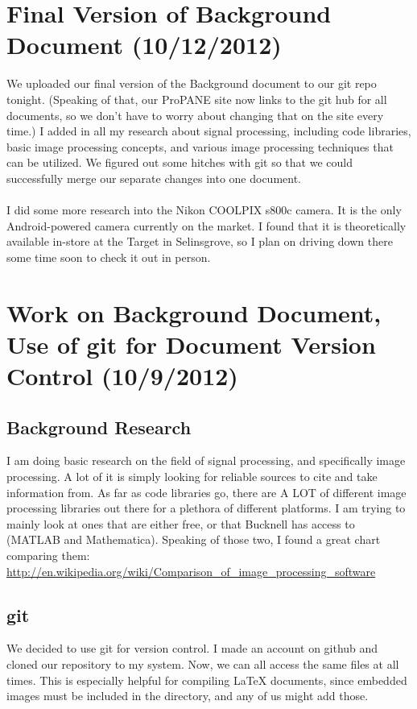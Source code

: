 \documentclass[]{article}
\begin{document}
	\section{Final Version of Background Document (10/12/2012)}
	We uploaded our final version of the Background document to our git repo tonight.  (Speaking of that, our ProPANE site now links to the git hub for all documents, so we don't have to worry about changing that on the site every time.)  I added in all my research about signal processing, including code libraries, basic image processing concepts, and various image processing techniques that can be utilized.  We figured out some hitches with git so that we could successfully merge our separate changes into one document.  \\ \\

I did some more research into the Nikon COOLPIX s800c camera.  It is the only Android-powered camera currently on the market.  I found that it is theoretically available in-store at the Target in Selinsgrove, so I plan on driving down there some time soon to check it out in person.  


	\section{Work on Background Document, Use of git for Document Version Control (10/9/2012)}
	\subsection*{Background Research}
	I am doing basic research on the field of signal processing, and specifically image processing.  A lot of it is simply looking for reliable sources to cite and take information from.  As far as code libraries go, there are A LOT of different image processing libraries out there for a plethora of different platforms.  I am trying to mainly look at ones that are either free, or that Bucknell has access to (MATLAB and Mathematica).  Speaking of those two, I found a great chart comparing them: \url{http://en.wikipedia.org/wiki/Comparison_of_image_processing_software} 

	\subsection*{git}
	We decided to use git for version control.  I made an account on github and cloned our repository to my system.  Now, we can all access the same files at all times. This is especially helpful for compiling LaTeX documents, since embedded images must be included in the directory, and any of us might add those.  
\end{document}
